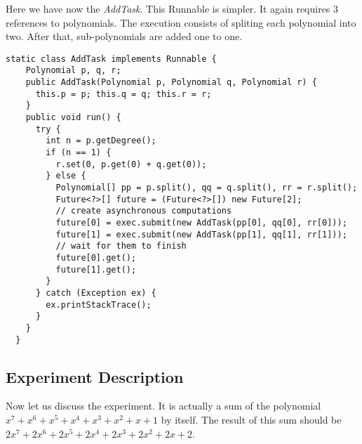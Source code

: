 \hfill
\par
Here we have now the \textit{AddTask}. This Runnable is simpler. It again
requires $3$ references to polynomials. The execution consists of spliting each
polynomial into two. After that, sub-polynomials are added one to one. 
\par
\hfill
\begin{lstlisting}[style=numbers]
  static class AddTask implements Runnable {
    Polynomial p, q, r;
    public AddTask(Polynomial p, Polynomial q, Polynomial r) {
      this.p = p; this.q = q; this.r = r;
    }
    public void run() {
      try {
        int n = p.getDegree();
        if (n == 1) {
          r.set(0, p.get(0) + q.get(0));
        } else {
          Polynomial[] pp = p.split(), qq = q.split(), rr = r.split();
          Future<?>[] future = (Future<?>[]) new Future[2];
          // create asynchronous computations
          future[0] = exec.submit(new AddTask(pp[0], qq[0], rr[0]));
          future[1] = exec.submit(new AddTask(pp[1], qq[1], rr[1]));
          // wait for them to finish
          future[0].get();
          future[1].get();
        }
      } catch (Exception ex) {
        ex.printStackTrace();
      }
    }
  }
\end{lstlisting}
\hfill
\par
\subsection{Experiment Description}
\par
Now let us discuss the experiment. It is actually a sum of the
polynomial $x^7+x^6+x^5+x^4+x^3+x^2+x+1$ by itself. The result of this
sum should be $2x^7+2x^6+2x^5+2x^4+2x^3+2x^2+2x+2$. 
\par
